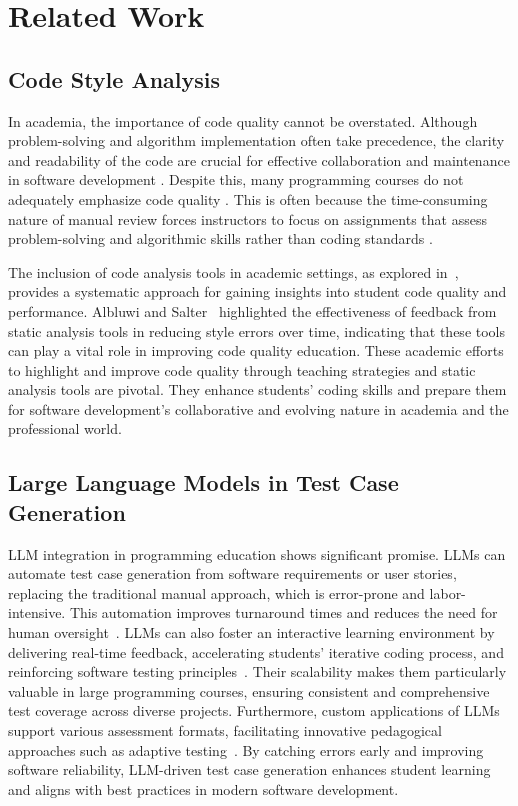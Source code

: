 \section{Related Work}\label{sec:background}
\subsection{Code Style Analysis}
In academia, the importance of code quality cannot be overstated. Although problem-solving and algorithm implementation often take precedence, the clarity and readability of the code are crucial for effective collaboration and maintenance in software development \cite{9637193}. Despite this, many programming courses do not adequately emphasize code quality \cite{Chen2018AnAA}. This is often because the time-consuming nature of manual review forces instructors to focus on assignments that assess problem-solving and algorithmic skills rather than coding standards \cite{9637193, 9766807}.

The inclusion of code analysis tools in academic settings, as explored in~\cite{10590588,10.1007/978-3-031-72483-1_1, Imhmed2024fosterCQ}, provides a systematic approach for gaining insights into student code quality and performance. Albluwi and Salter~\cite{albluwi2020using} highlighted the effectiveness of feedback from static analysis tools in reducing style errors over time, indicating that these tools can play a vital role in improving code quality education. These academic efforts to highlight and improve code quality through teaching strategies and static analysis tools are pivotal. They enhance students' coding skills and prepare them for software development's collaborative and evolving nature in academia and the professional world.

\subsection{Large Language Models in Test Case Generation}
LLM integration in programming education shows significant promise. LLMs can automate test case generation from software requirements or user stories, replacing the traditional manual approach, which is error-prone and labor-intensive. This automation improves turnaround times and reduces the need for human oversight~\cite{kumar2024using}. LLMs can also foster an interactive learning environment by delivering real-time feedback, accelerating students' iterative coding process, and reinforcing software testing principles~\cite{xiong2023program, dobslaw2025challenges}. Their scalability makes them particularly valuable in large programming courses, ensuring consistent and comprehensive test coverage across diverse projects. Furthermore, custom applications of LLMs support various assessment formats, facilitating innovative pedagogical approaches such as adaptive testing~\cite{xue2024llm4fin}. By catching errors early and improving software reliability, LLM-driven test case generation enhances student learning and aligns with best practices in modern software development.

